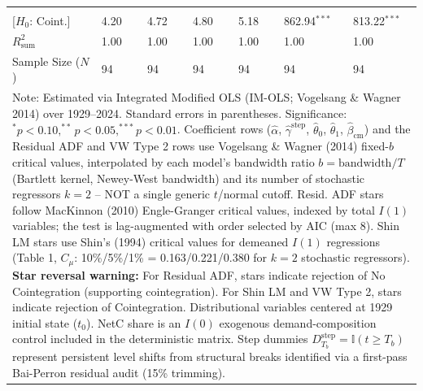 \begin{table}[H]
\begin{tabular}{p{3.8cm}p{1.35cm}p{1.35cm}p{1.35cm}p{1.35cm}p{1.35cm}p{1.35cm}}
\makecell[l]{VW Type 2 ($S_{\text{Type 2}}$) \\ {\scriptsize [$H_0$: Coint.]}} & 4.20 & 4.72 & 4.80 & 5.18 & 862.94$^{***}$ & 813.22$^{***}$  \\
\midrule
$R^2_{\text{sum}}$ & 1.00 & 1.00 & 1.00 & 1.00 & 1.00 & 1.00  \\
Sample Size ($N$) & 94 & 94 & 94 & 94 & 94 & 94  \\
\bottomrule
\multicolumn{7}{p{13.2cm}}{\footnotesize Note: Estimated via Integrated Modified OLS (IM-OLS; Vogelsang \& Wagner 2014) over 1929--2024. Standard errors in parentheses. Significance: $^*p<0.10, ^{**}p<0.05, ^{***}p<0.01$. Coefficient rows ($\hat{\alpha}$, $\hat{\gamma}^{\text{step}}$, $\hat{\theta}_0$, $\hat{\theta}_1$, $\hat{\beta}_{\text{cm}}$) and the Residual ADF and VW Type 2 rows use Vogelsang \& Wagner (2014) fixed-$b$ critical values, interpolated by each model's bandwidth ratio $b=\text{bandwidth}/T$ (Bartlett kernel, Newey-West bandwidth) and its number of stochastic regressors $k=2$ -- NOT a single generic $t$/normal cutoff. Resid. ADF stars follow MacKinnon (2010) Engle-Granger critical values, indexed by total $I(1)$ variables; the test is lag-augmented with order selected by AIC (max 8). Shin LM stars use Shin's (1994) critical values for demeaned $I(1)$ regressions (Table 1, $C_\mu$: 10\%/5\%/1\% = 0.163/0.221/0.380 for $k=2$ stochastic regressors). \textbf{Star reversal warning:} For Residual ADF, stars indicate rejection of No Cointegration (supporting cointegration). For Shin LM and VW Type 2, stars indicate rejection of Cointegration. Distributional variables centered at 1929 initial state ($t_0$). NetC share is an $I(0)$ exogenous demand-composition control included in the deterministic matrix. Step dummies $D^{\text{step}}_{T_b} = \mathbb{I}(t \ge T_b)$ represent persistent level shifts from structural breaks identified via a first-pass Bai-Perron residual audit (15\% trimming).}
\end{tabular}
\end{table}
